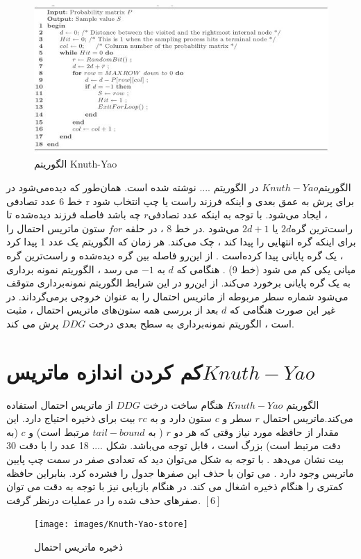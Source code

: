       \begin{figure}[!htb]
      	\includegraphics[width=\linewidth]{images/Knuth-Yao-alg}
      	\caption{الگوریتم Knuth-Yao}\label{fig:logtonemap}
      	\endminipage\hfill
      \end{figure}
الگوریتم$ Knuth-Yao$  در الگوریتم .... نوشته شده است. همان‌طور که دیده‌می‌شود در خط 6  عدد تصادفی r برای پرش به عمق  بعدی و اینکه فرزند راست یا چپ انتخاب شود ، ایجاد می‌شود. با توجه به اینکه عدد تصادفی$ r$  چه باشد فاصله فرزند دیده‌شده تا راست‌ترین گره$ 2d$ یا $2d + 1$  می‌شود .در خط 8 ، در حلقه $for$  ستون ماتریس احتمال  را برای اینکه گره انتهایی را پیدا کند ،  چک می‌کند. هر زمان که الگوریتم یک  عدد 1 پیدا کرد ، یک گره پایانی پیدا کرده‌است   . از این‌رو فاصله بین گره دیده‌شده و راست‌ترین گره میانی یکی کم می شود (خط 9) . هنگامی که $d  $  به $-1$ می رسد ، الگوریتم نمونه برداری به یک گره پایانی برخورد می‌کند. از این‌رو در این شرایط الگوریتم نمونه‌برداری متوقف می‌شود شماره سطر مربوطه از ماتریس احتمال را به عنوان خروجی برمی‌گرداند. در غیر این‌ صورت هنگامی که $d$  بعد از بررسی همه ستون‌های ماتریس احتمال ، مثبت است ، الگوریتم نمونه‌برداری به سطح بعدی درخت $DDG$ پرش می کند. 
\section{کم کردن اندازه ماتریس$ Knuth-Yao$}

الگوریتم $Knuth-Yao$  هنگام ساخت درخت $DDG$ از ماتریس احتمال استفاده می‌کند.ماتریس احتمال $r$ سطر و $c$ ستون دارد و به $rc$ بیت برای ذخیره احتیاج دارد. این مقدار از حافظه مورد نیاز وقتی که هر دو $r$ (  به $tail-bound$ مرتبط است) و $c$ (به دقت مرتبط است) بزرگ است ، قابل توجه می‌باشد. شکل .... 18 عدد را با دقت 30 بیت  نشان می‌دهد . با توجه به شکل می‌توان دید که تعدادی صفر در سمت چپ پایین ماتریس وجود دارد . می توان با حذف این صفرها جدول را فشرده‌ کرد. بنابراین حافظه کمتری را هنگام ذخیره اشغال می کند. در هنگام بازیابی نیز با توجه به دقت می توان صفرهای حذف شده را در عملیات درنظر گرفت. $[6]$

    \begin{figure}[!htb]
      	\texttt{[image: images/Knuth-Yao-store]}
      	\caption{ذخیره ماتریس احتمال}\label{fig:logtonemap}
      	\endminipage\hfill
      \end{figure}

